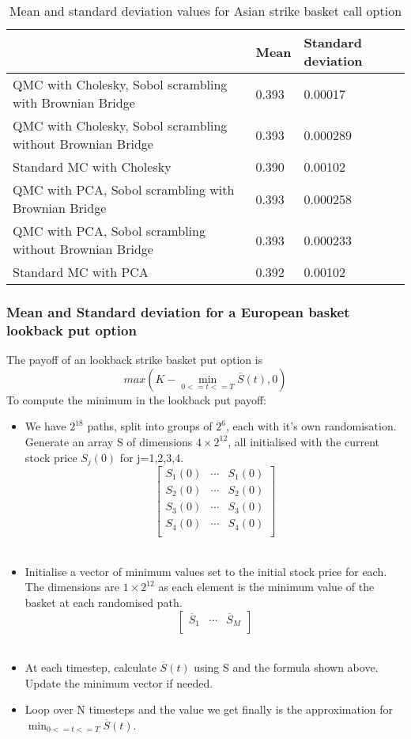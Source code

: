 \documentclass{article}
\begin{document}
\begin{table} [h!]
\centering
\begin{tabular}{| l | l | l |}
\hline
 & Mean & Standard deviation \\ \hline
QMC with Cholesky, Sobol scrambling with Brownian Bridge & 0.393 & 0.00017 \\ \hline
QMC with Cholesky, Sobol scrambling without Brownian Bridge & 0.393 & 0.000289 \\ \hline
Standard MC with Cholesky & 0.390 & 0.00102 \\ \hline
QMC with PCA, Sobol scrambling with Brownian Bridge & 0.393 & 0.000258 \\ \hline
QMC with PCA, Sobol scrambling without Brownian Bridge & 0.393 & 0.000233 \\ \hline
Standard MC with PCA & 0.392 & 0.00102 \\
\hline
\end{tabular}
\caption{Mean and standard deviation values for Asian strike basket call option}
\end{table}

\subsubsection* {Mean and Standard deviation for a European basket lookback put option}
The payoff of an lookback strike basket put option is  \[max(K - \min_{0<=t<=T}\overline{S}(t), 0)\]
To compute the minimum in the lookback put payoff:
\begin{itemize}
\item We have $2^{18}$ paths, split into groups of $2^6$, each with it's own randomisation. Generate an array S of dimensions $4 \times 2^{12} $, all initialised with the current stock price $S_j(0)$ for j=1,2,3,4.
\[
\begin{bmatrix}
S_1(0) & \cdots & S_1(0)\\
S_2(0) & \cdots & S_2(0)\\
S_3(0) & \cdots & S_3(0)\\
S_4(0) & \cdots & S_4(0)\\
\end{bmatrix}
\]\
\item Initialise a vector of minimum values set to the initial stock price for each. The dimensions are $1 \times 2^{12} $ as each element is the minimum value of the basket at each randomised path. 
\[
\begin{bmatrix}
\overline{S}_1 & \cdots & \overline{S}_M\\
\end{bmatrix}
\]\
\item At each timestep, calculate $\overline{S}(t)$ using S and the formula shown above. Update the minimum vector if needed. 
\item Loop over N timesteps and the value we get finally is the approximation for $\min_{0<=t<=T}\overline{S}(t)$.
\end{itemize}
\end{document}
